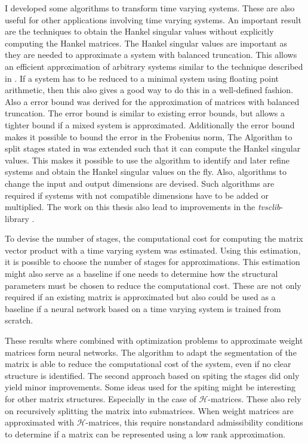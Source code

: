 \documentclass[doctype=mastersthesis,BCOR=15mm,biblatex]{ldvbook}%
\begin{document}
I developed some algorithms to transform time varying systems.
These are also useful for other applications involving time varying systems.
An important result are the techniques to obtain the Hankel singular values without explicitly computing the Hankel matrices.
The Hankel singular values are important as they are needed to approximate a system with balanced truncation.
This allows an efficient approximation of arbitrary systems similar to the technique described in \cite{chandrasekaran_fast_2005}.
If a system has to be reduced to a minimal system using floating point arithmetic, then this also gives a good way to do this in a well-defined fashion.
Also a error bound was derived for the approximation of matrices with balanced truncation.
The error bound is similar to existing error bounds, but allows a tighter bound if a mixed system is approximated.
Additionally the error bound makes it possible to bound the error in the Frobenius norm,
The Algorithm to split stages stated in \cite{chandrasekaran_fast_2005} was extended such that it can compute the Hankel singular values.
This makes it possible to use the algorithm to identify and later refine systems and obtain the Hankel singular values on the fly.
Also, algorithms to change the input and output dimensions are devised. 
Such algorithms are required if systems with not compatible dimensions have to be added or multiplied.
The work on this thesis also lead to improvements in the \emph{tvsclib}-library \cite{kissel_time_2022}.

To devise the number of stages, the computational cost for computing the matrix vector product with a time varying system was estimated.
Using this estimation, it is possible to choose the number of stages for approximations.
This estimation might also serve as a baseline if one needs to determine how the structural parameters must be chosen to reduce the computational cost.
These are not only required if an existing matrix is approximated but also could be used as a baseline if a neural network based on a time varying system is trained from scratch.

These results where combined with optimization problems to approximate weight matrices form neural networks.
The algorithm to adapt the segmentation of the matrix is able to reduce the computational cost of the system, even if no clear structure is identified.
The second approach based on spiting the stages did only yield minor improvements.
Some ideas used for the spiting might be interesting for other matrix structures.
Especially in the case of $\mathcal{H}$-matrices.
These also rely on recursively splitting the matrix into submatrices.
When weight matrices are approximated with $\mathcal{H}$-matrices, this require nonstandard admissibility conditions to determine if a matrix can be represented using a low rank approximation.
\end{document}

